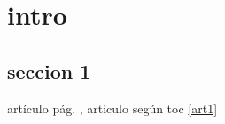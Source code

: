 \documentclass[ %
	Journal, %
	FontSize=10pt
]{../Preamble/UMSAetn}
\begin{document}
		
	\tableofcontents
	\chapter{intro}
	\section{seccion 1}
	artículo  pág. \pageref{art1}, articulo según toc \ref{art1}
	
	\printbibliography
	\nocite{*} %
\end{document}
